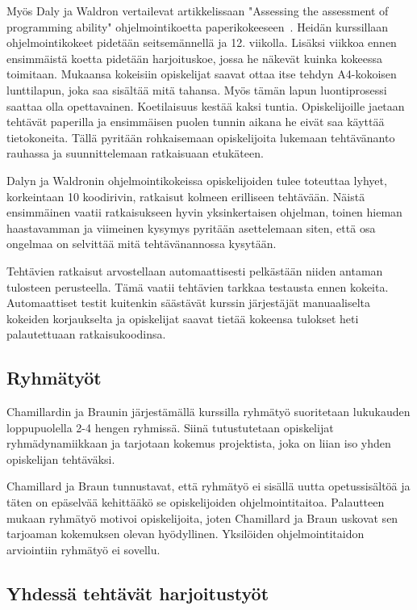 \documentclass[finnish]{../tktltiki2}
\theoremstyle{definition}
\theoremstyle{remark}
\begin{document}
Myös Daly ja Waldron vertailevat artikkelissaan "Assessing the assessment of programming ability" ohjelmointikoetta paperikokeeseen~\cite{DW04}. Heidän kurssillaan ohjelmointikokeet pidetään seitsemännellä ja 12. viikolla. Lisäksi viikkoa ennen ensimmäistä koetta pidetään harjoituskoe, jossa he näkevät kuinka kokeessa toimitaan. Mukaansa kokeisiin opiskelijat saavat ottaa itse tehdyn A4-kokoisen lunttilapun, joka saa sisältää mitä tahansa. Myös tämän lapun luontiprosessi saattaa olla opettavainen. Koetilaisuus kestää kaksi tuntia. Opiskelijoille jaetaan tehtävät paperilla ja ensimmäisen puolen tunnin aikana he eivät saa käyttää tietokoneita. Tällä pyritään rohkaisemaan opiskelijoita lukemaan tehtävänanto rauhassa ja suunnittelemaan ratkaisuaan etukäteen.

Dalyn ja Waldronin ohjelmointikokeissa opiskelijoiden tulee toteuttaa lyhyet, korkeintaan 10 koodirivin, ratkaisut kolmeen erilliseen tehtävään. Näistä ensimmäinen vaatii ratkaisukseen hyvin yksinkertaisen ohjelman, toinen hieman haastavamman ja viimeinen kysymys pyritään asettelemaan siten, että osa ongelmaa on selvittää mitä tehtävänannossa kysytään.

Tehtävien ratkaisut arvostellaan automaattisesti pelkästään niiden antaman tulosteen perusteella. Tämä vaatii tehtävien tarkkaa testausta ennen kokeita. Automaattiset testit kuitenkin säästävät kurssin järjestäjät manuaaliselta kokeiden korjaukselta ja opiskelijat saavat tietää kokeensa tulokset heti palautettuaan ratkaisukoodinsa.

\subsection{Ryhmätyöt}

Chamillardin ja Braunin järjestämällä kurssilla ryhmätyö suoritetaan lukukauden loppupuolella 2-4 hengen ryhmissä. Siinä tutustutetaan opiskelijat ryhmädynamiikkaan ja tarjotaan kokemus projektista, joka on liian iso yhden opiskelijan tehtäväksi.

Chamillard ja Braun tunnustavat, että ryhmätyö ei sisällä uutta opetussisältöä ja täten on epäselvää kehittääkö se opiskelijoiden ohjelmointitaitoa. Palautteen mukaan ryhmätyö motivoi opiskelijoita, joten Chamillard ja Braun uskovat sen tarjoaman kokemuksen olevan hyödyllinen. Yksilöiden ohjelmointitaidon arviointiin ryhmätyö ei sovellu.

\subsection{Yhdessä tehtävät harjoitustyöt}
\end{document}
